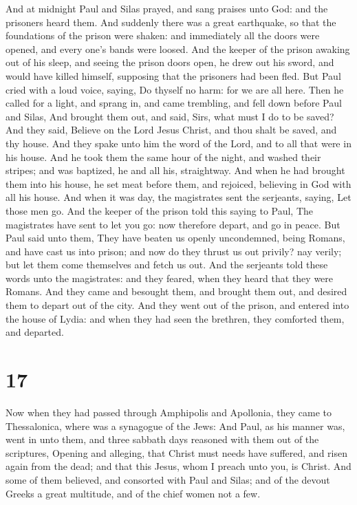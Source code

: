  And at midnight Paul and Silas prayed, and sang praises
unto God: and the prisoners heard them.  And suddenly
there was a great earthquake, so that the foundations of the prison were
shaken: and immediately all the doors were opened, and every one's bands
were loosed.  And the keeper of the prison awaking out of
his sleep, and seeing the prison doors open, he drew out his sword, and
would have killed himself, supposing that the prisoners had been fled.
 But Paul cried with a loud voice, saying, Do thyself no
harm: for we are all here.  Then he called for a light,
and sprang in, and came trembling, and fell down before Paul and Silas,
 And brought them out, and said, Sirs, what must I do to
be saved?  And they said, Believe on the Lord Jesus
Christ, and thou shalt be saved, and thy house.  And they
spake unto him the word of the Lord, and to all that were in his house.
 And he took them the same hour of the night, and washed
their stripes; and was baptized, he and all his, straightway.
 And when he had brought them into his house, he set meat
before them, and rejoiced, believing in God with all his house.
 And when it was day, the magistrates sent the serjeants,
saying, Let those men go.  And the keeper of the prison
told this saying to Paul, The magistrates have sent to let you go: now
therefore depart, and go in peace.  But Paul said unto
them, They have beaten us openly uncondemned, being Romans, and have
cast us into prison; and now do they thrust us out privily? nay verily;
but let them come themselves and fetch us out.  And the
serjeants told these words unto the magistrates: and they feared, when
they heard that they were Romans.  And they came and
besought them, and brought them out, and desired them to depart out of
the city.  And they went out of the prison, and entered
into the house of Lydia: and when they had seen the brethren, they
comforted them, and departed.

\hypertarget{section-16}{%
\section{17}\label{section-16}}

 Now when they had passed through Amphipolis and
Apollonia, they came to Thessalonica, where was a synagogue of the Jews:
 And Paul, as his manner was, went in unto them, and three
sabbath days reasoned with them out of the scriptures, 
Opening and alleging, that Christ must needs have suffered, and risen
again from the dead; and that this Jesus, whom I preach unto you, is
Christ.  And some of them believed, and consorted with
Paul and Silas; and of the devout Greeks a great multitude, and of the
chief women not a few.

